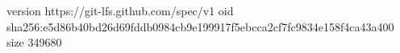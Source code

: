 version https://git-lfs.github.com/spec/v1
oid sha256:e5d86b40bd26d69fddb0984cb9e199917f5ebcca2cf7fc9834e158f4ca43a400
size 349680
